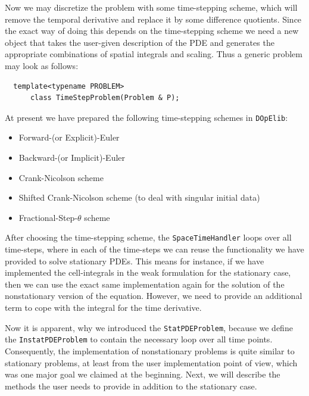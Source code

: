 \documentclass[smallextended]{svjour3}       %
\numberwithin{equation}{section}
\newcommand{\dope}{\texttt{DOpElib}}
\begin{document}
Now we may discretize the problem with some time-stepping scheme, which will 
remove the temporal derivative and replace it by some difference quotients. 
Since the exact way of doing this depends on the time-stepping scheme 
we need a new object that takes the user-given description of the PDE and 
generates the appropriate combinations of spatial integrals and scaling.
Thus a generic problem may look as follows:
\begin{lstlisting}
  template<typename PROBLEM>
      class TimeStepProblem(Problem & P);
\end{lstlisting}
At present we have prepared the following time-stepping schemes in \dope:
\begin{itemize}
\item Forward-(or Explicit)-Euler
\item Backward-(or Implicit)-Euler
\item Crank-Nicolson scheme
\item Shifted Crank-Nicolson scheme (to deal with singular initial data)
\item Fractional-Step-$\theta$ scheme
\end{itemize}
After choosing the time-stepping scheme, the \texttt{SpaceTimeHandler}  
loops over all time-steps, where in each of the 
time-steps we can reuse the functionality we have provided to solve 
stationary PDEs. 
This means for instance, if we have implemented the 
cell-integrals in the weak formulation for the stationary case, 
then we can use the exact same 
implementation again for the solution of the nonstationary version of 
the equation. However, we need to provide an additional 
term to cope with the integral for the time derivative.

Now it is apparent, why we introduced the \texttt{StatPDEProblem}, because
we define the \texttt{InstatPDEProblem} to contain the necessary 
loop over all time points. Consequently, the implementation 
of nonstationary problems is quite similar to stationary problems,
at least from the user implementation point of view,
which was one major goal we claimed at the beginning.
Next, we will describe the methods the user needs to 
provide in addition to the stationary case.
\end{document}
